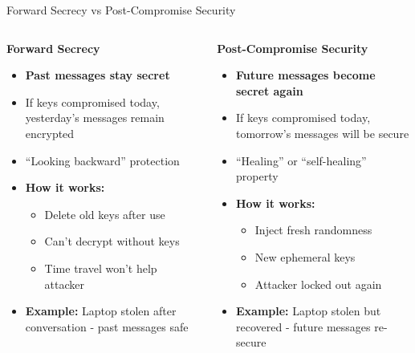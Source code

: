 \documentclass[aspectratio=169, lualatex, handout]{beamer}
\begin{document}
\begin{frame}{Forward Secrecy vs Post-Compromise Security}
	\begin{columns}
		\begin{column}{0.5\textwidth}
			\textbf{Forward Secrecy}
			\begin{itemize}
				\item \textbf{Past messages stay secret}
				\item If keys compromised today, yesterday's messages remain encrypted
				\item ``Looking backward'' protection
				\item \textbf{How it works:}
				      \begin{itemize}
					      \item Delete old keys after use
					      \item Can't decrypt without keys
					      \item Time travel won't help attacker
				      \end{itemize}
				\item \textbf{Example:} Laptop stolen after conversation - past messages safe
			\end{itemize}
		\end{column}
		\begin{column}{0.5\textwidth}
			\textbf{Post-Compromise Security}
			\begin{itemize}
				\item \textbf{Future messages become secret again}
				\item If keys compromised today, tomorrow's messages will be secure
				\item ``Healing'' or ``self-healing'' property
				\item \textbf{How it works:}
				      \begin{itemize}
					      \item Inject fresh randomness
					      \item New ephemeral keys
					      \item Attacker locked out again
				      \end{itemize}
				\item \textbf{Example:} Laptop stolen but recovered - future messages re-secure
			\end{itemize}
		\end{column}
	\end{columns}
\end{frame}
\end{document}
